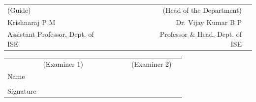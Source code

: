 \vspace{0.2in}
\small{
\begin{flushleft}
\begin{tabular}{lllllllllrl}
(Guide) & & & & & & & & &(Head of the Department)\\
Krishnaraj P M & & & & & & & & &Dr. Vijay Kumar B P\\
Assistant Professor, Dept. of ISE   & & & & & & & & &Professor \& Head, Dept. of ISE
\end{tabular}
\end{flushleft}
\vspace{0.1in}
\begin{flushleft}
\begin{tabular}{llllllllll}
 & (Examiner 1) & & & & & & & (Examiner 2)  \\
Name &  & & & &\\ \\
Signature & & & & &
\end{tabular}
\end{flushleft}}

